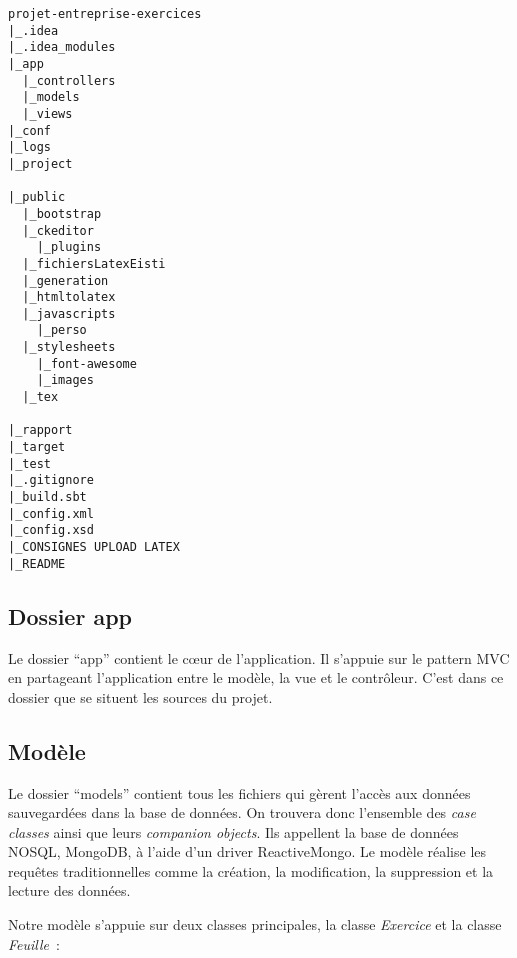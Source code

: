 \begin{verbatim}
projet-entreprise-exercices
|_.idea
|_.idea_modules
|_app
  |_controllers
  |_models
  |_views
|_conf
|_logs 
|_project

|_public
  |_bootstrap
  |_ckeditor
    |_plugins
  |_fichiersLatexEisti
  |_generation
  |_htmltolatex
  |_javascripts
    |_perso
  |_stylesheets
    |_font-awesome
    |_images
  |_tex
  
|_rapport
|_target
|_test
|_.gitignore
|_build.sbt
|_config.xml
|_config.xsd
|_CONSIGNES UPLOAD LATEX
|_README
\end{verbatim}

\subsection{Dossier app}

Le dossier \enquote{app} contient le c\oe ur de l'application. Il s'appuie sur le pattern MVC en partageant l'application entre le modèle, la vue et le contrôleur. C'est dans ce dossier que se situent les sources du projet. 

\subsection{Modèle}
Le dossier \enquote{models} contient tous les fichiers qui gèrent l'accès aux données sauvegardées dans la base de données. On trouvera donc l'ensemble des \emph{case classes} ainsi que leurs \emph{companion objects}. Ils appellent la base de données NOSQL, MongoDB, à l'aide d'un driver ReactiveMongo. Le modèle réalise les requêtes traditionnelles comme la création, la modification, la suppression et la lecture des données.

Notre modèle s'appuie sur deux classes principales, la classe \emph{Exercice} et la classe \emph{Feuille}~:


